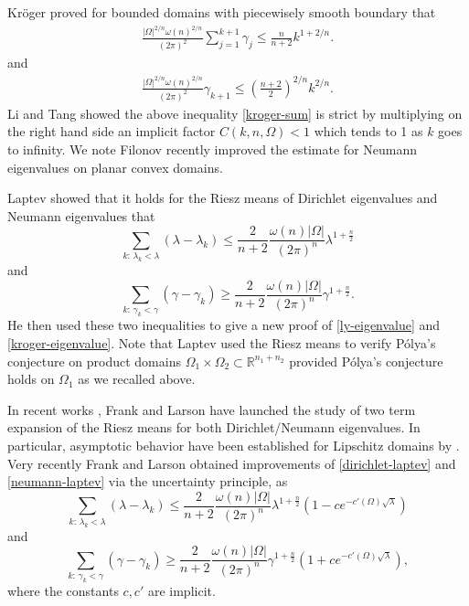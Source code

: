 \documentclass[11pt,twoside, leqno]{article}
\def\rr{{\mathbb R}}
\numberwithin{equation}{section}
\begin{document}
Kr\"oger \cite{Kroger92} proved for bounded domains with piecewisely smooth boundary that
\begin{align}\label{kroger-sum}
\frac{ |\Omega|^{2/n}\omega(n)^{2/n}}{(2\pi)^2}\sum_{j=1}^{k+1}\gamma_j \le \frac{n}{n+2} k^{1+2/n}.
\end{align}
and
\begin{align}\label{kroger-eigenvalue}
\frac{ |\Omega|^{2/n}\omega(n)^{2/n}}{(2\pi)^2}\gamma_{k+1} \le \left(\frac{n+2}{2}\right)^{2/n} k^{2/n}.
\end{align}
Li and Tang \cite{LT06} showed the above inequality \eqref{kroger-sum} is strict by multiplying on the right hand side an implicit factor $C(k,n,\Omega)<1$ which tends to 1 as $k$
goes to infinity.
We note Filonov \cite{Fil25} recently improved the estimate for Neumann eigenvalues on planar convex domains.


Laptev \cite{La97} showed that it holds for the Riesz means of Dirichlet eigenvalues and Neumann eigenvalues that
\begin{equation}\label{dirichlet-laptev}
\sum_{k:\,\lambda_k<\lambda} (\lambda-\lambda_k)\le \frac{2 }{n+2} \frac{\omega(n)|\Omega|}{(2\pi)^{n} } \lambda^{1+\frac{n}{2}}
\end{equation}
and
\begin{equation}\label{neumann-laptev}
\sum_{k:\,\gamma_k<\gamma} (\gamma-\gamma_k)\ge \frac{2 }{n+2} \frac{\omega(n)|\Omega|}{(2\pi)^{n} } \gamma^{1+\frac{n}{2}}.
\end{equation}
He then used these two inequalities to give a new proof of \eqref{ly-eigenvalue} and \eqref{kroger-eigenvalue}.
Note that Laptev \cite{La97} used the Riesz means to verify  P\'olya's conjecture on product domains $\Omega_1\times\Omega_2\subset\rr^{n_1+n_2}$
provided P\'olya's conjecture holds on $\Omega_1$ as we recalled above.

In recent works \cite{FL24a,FL24b}, Frank and Larson have launched the study of two term expansion of the Riesz means
for both Dirichlet/Neumann eigenvalues. In particular, asymptotic behavior have been established for Lipschitz domains
by  \cite{FL24a,FL24b}. Very recently Frank and Larson \cite{FL24a} obtained improvements of \eqref{dirichlet-laptev}
and \eqref{neumann-laptev} via the uncertainty principle, as
\begin{equation}\label{dirichlet-fl}
\sum_{k:\,\lambda_k<\lambda} (\lambda-\lambda_k)\le \frac{2 }{n+2} \frac{\omega(n)|\Omega|}{(2\pi)^{n} } \lambda^{1+\frac{n}{2}}\left(1-ce^{-c'(\Omega)\sqrt\lambda}\right)
\end{equation}
and
\begin{equation}\label{neumann-fl}
\sum_{k:\,\gamma_k<\gamma} (\gamma-\gamma_k)\ge \frac{2 }{n+2} \frac{\omega(n)|\Omega|}{(2\pi)^{n} } \gamma^{1+\frac{n}{2}}\left(1+ce^{-c'(\Omega)\sqrt\lambda}\right),
\end{equation}
where the constants $c,c'$ are implicit.
\end{document}
